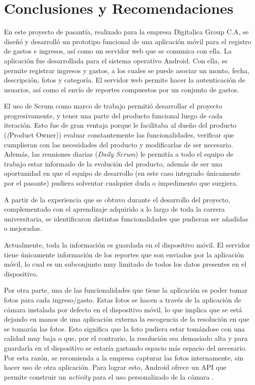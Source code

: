 \chapter{Conclusiones y Recomendaciones} \label{chap:conclusiones}

En este proyecto de pasantía, realizado para la empresa Digitalica Group C.A, se diseñó y desarrolló un prototipo funcional de una aplicación móvil para el registro de gastos e ingresos, así como un servidor web que se comunica con ella.  La aplicación fue desarrollada para el sistema operativo Android. Con ella, se permite registrar ingresos y gastos, a los cuales se puede asociar un monto, fecha, descripción, fotos y categoría. El servidor web permite hacer la autenticación de usuarios, así como el envío de reportes compuestos por un conjunto de gastos.

El uso de Scrum como marco de trabajo permitió desarrollar el proyecto progresivamente, y tener una parte del producto funcional luego de cada iteración. Esto fue de gran ventaja porque le facilitaba al dueño del producto (\textit(Product Owner)) evaluar constantemente las funcionalidades, verificar que cumplieran con las necesidades del producto y modificarlas de ser necesario. Además, las reuniones diarias (\textit{Daily Scrum}) le permitía a todo el equipo de trabajo estar informado de la evolución del producto, además de ser una oportunidad en que el equipo de desarrollo (en este caso integrado únicamente por el pasante) pudiera solventar cualquier duda o impedimento que surgiera.

A partir de la experiencia que se obtuvo durante el desarrollo del proyecto, complementado con el aprendizaje adquirido a lo largo de toda la carrera universitaria, se identificaron distintas funcionalidades que pudieran ser añadidas o mejoradas.

Actualmente, toda la información es guardada en el dispositivo móvil. El servidor tiene únicamente información de los reportes que son enviados por la aplicación móvil, lo cual es un subconjunto  muy limitado de todos los datos presentes en el dispositivo.

Por otra parte, una de las funcionalidades que tiene la aplicación es poder tomar fotos para cada ingreso/gasto. Estas fotos se hacen a través de la aplicación de cámara instalada por defecto en el dispositivo móvil, lo que implica que se está dejando en manos de una aplicación externa la escogencia de la resolución en que se tomarán las fotos. Esto significa que la foto pudiera estar tomándose con una calidad muy baja o que, por el contrario, la resolución sea demasiado alta y para guardarla en el dispositivo se estaría gastando espacio más espacio del necesario. Por esta razón, se recomienda a la empresa capturar las fotos internamente, sin hacer uso de otra aplicación. Para lograr esto, Android ofrece un API que permite construir un \textit{activity} para el uso personalizado de la cámara \cite{AND4}.

